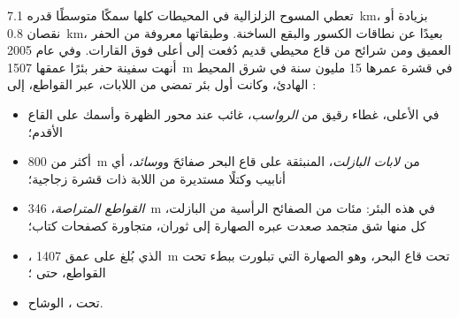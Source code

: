 تعطي المسوح الزلزالية في المحيطات كلها  سمكًا متوسطًا
قدره \qty{7.1}{km}، بزيادة أو نقصان \qty{0.8}{km}، بعيدًا عن نطاقات
الكسور والبقع الساخنة. وطبقاتها معروفة من الحفر العميق ومن شرائح
من قاع محيطي قديم دُفعت إلى أعلى فوق القارات. وفي عام 2005 أنهت سفينة حفر
بئرًا عمقها \qty{1507}{m} في قشرة عمرها 15 مليون سنة في
شرق المحيط الهادئ، وكانت أول بئر تمضي من اللابات، عبر القواطع، إلى
:

\begin{itemize}
  \item في الأعلى، غطاء رقيق من \emph{الرواسب}، غائب عند محور
        الظهرة وأسمك على القاع الأقدم؛
  \item أكثر من \qty{800}{m} من \emph{لابات البازلت}، المنبثقة على قاع
        البحر صفائحَ و\emph{وسائد}، أي أنابيب وكتلًا مستديرة من
        اللابة ذات قشرة زجاجية؛
  \item \emph{القواطع المتراصة}، \qty{346}{m} في هذه البئر: مئات من
        الصفائح الرأسية من البازلت، كل منها شق متجمد صعدت عبره الصهارة
        إلى ثوران، متجاورة كصفحات كتاب؛
  \item \emph{}، الذي بُلغ على عمق \qty{1407}{m} تحت قاع البحر، وهو الصهارة
        التي تبلورت ببطء تحت القواطع، حتى ؛
  \item تحت ، \emph{} الوشاح.
\end{itemize}

